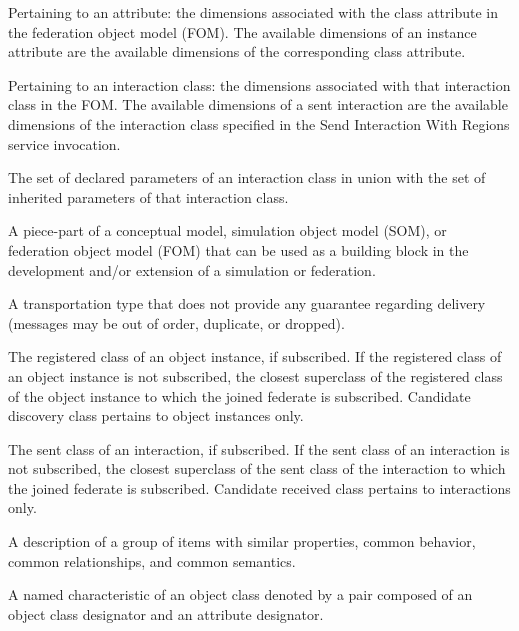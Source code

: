 \begin{stdalphalist}
    \item Pertaining to an attribute: the dimensions associated with the class attribute in the federation object model (FOM). The available dimensions of an instance attribute are the available dimensions of the corresponding class attribute.
    \item Pertaining to an interaction class: the dimensions associated with that interaction class in the FOM. The available dimensions of a sent interaction are the available dimensions of the interaction class specified in the Send Interaction With Regions service invocation.
\end{stdalphalist}

 The set of declared parameters of an interaction class in union with the set of inherited parameters of that interaction class.

 A piece-part of a conceptual model, simulation object model (SOM), or federation object model (FOM) that can be used as a building block in the development and/or extension of a simulation or federation.

 A transportation type that does not provide any guarantee regarding delivery (messages may be out of order, duplicate, or dropped).

\clearpage
{} The registered class of an object instance, if subscribed. If the registered class of an object instance is not subscribed, the closest superclass of the registered class of the object instance to which the joined federate is subscribed. Candidate discovery class pertains to object instances only.

 The sent class of an interaction, if subscribed. If the sent class of an interaction is not subscribed, the closest superclass of the sent class of the interaction to which the joined federate is subscribed. Candidate received class pertains to interactions only.

 A description of a group of items with similar properties, common behavior, common relationships, and common semantics.

 A named characteristic of an object class denoted by a pair composed of an object class designator and an attribute designator.

